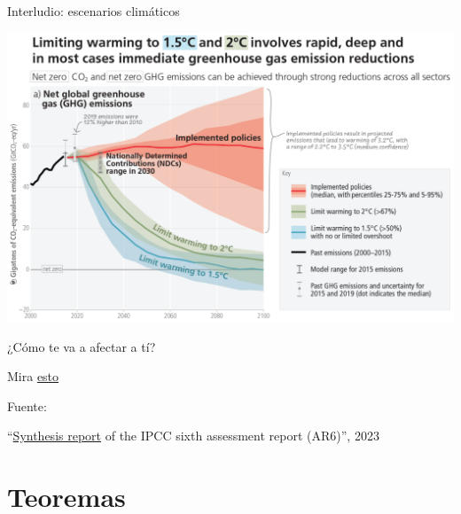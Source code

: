 \documentclass[aspectratio=169, xcolor={usenames,svgnames,dvipsnames}]{beamer}
\begin{document}

\begin{frame}{Interludio: \hspace{3mm}escenarios climáticos}

    \begin{minipage}[c]{0.8\linewidth}
        \vspace{2mm}
        \centering
			\includegraphics[width=1\linewidth]{../figs/Greenhouse_gas_emission_scenarios.PNG}
    \end{minipage}
    \hfill
    \begin{minipage}[c]{0.18\linewidth}
        \vspace{17mm}
        \small{¿Cómo \alert{te va a afectar a tí}? 

        \vspace{3mm}
        Mira \href{https://elpais.com/especiales/2021/como-seria-el-planeta-con-un-calentamiento-de-4-grados/}{esto}}

        \vspace{23mm}
        \footnotesize{Fuente:
        
        ``\href{https://report.ipcc.ch/ar6syr/pdf/IPCC_AR6_SYR_SPM.pdf?__cf_chl_tk=ki6vfeXGNrQoeJa_mdHq7CCjQah5xUcEv_yD3Njm1_U-1679392056-0-gaNycGzNCfs}{Synthesis report} of the IPCC sixth assessment report (AR6)'', 2023}
    \end{minipage}
\end{frame}


\label{diapo:Teoremas}
\section{Teoremas}
\end{document}
